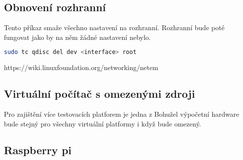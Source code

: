 \subsection*{Obnovení rozhranní}
Tento příkaz smaže všechno nastavení na rozhranní. Rozhranní bude poté fungovat jako by na něm žádné nastavení nebylo.
\begin{lstlisting}[language=bash]
    sudo tc qdisc del dev <interface> root
\end{lstlisting}

https://wiki.linuxfoundation.org/networking/netem

\subsection{Virtuální počítač s omezenými zdroji}

Pro zajištění více testovacích platforem je jedna z
Bohužel výpočetní hardware bude stejný pro všechny virtuální platformy i když bude omezený.

\subsection*{Raspberry pi}